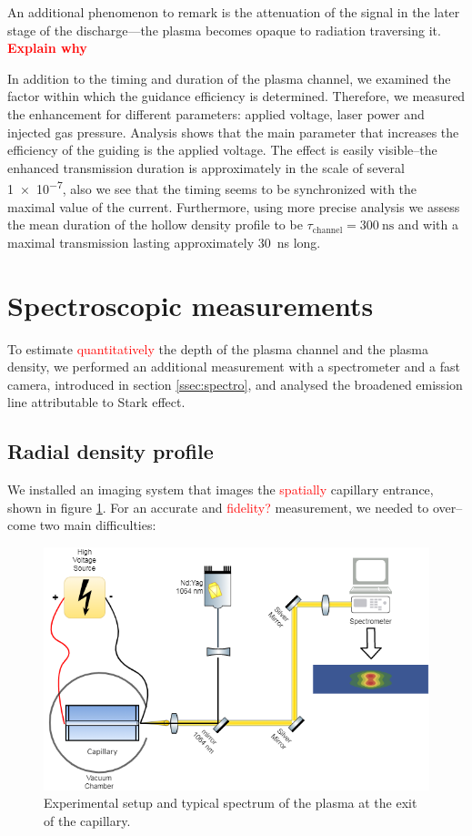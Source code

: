 \documentclass[justified,nofonts,nobib,openany]{tufte-book}
\begin{document}
An additional phenomenon to remark is the attenuation of the signal in the later stage of the discharge---the plasma becomes opaque to radiation traversing it. \textcolor{red}{\textbf{Explain why}}

In addition to the timing and duration of the plasma channel, we examined the factor within which the guidance efficiency is determined. Therefore, we measured the enhancement for different parameters: applied voltage, laser power and injected gas pressure. Analysis shows that the main parameter that increases the efficiency of the guiding is the applied voltage. The effect is easily visible--the enhanced transmission duration is approximately in the scale of several \SI{1e-7}{\sec}, also we see that the timing seems to be synchronized with the maximal value of the current. Furthermore, using more precise analysis we assess the mean duration of the hollow density profile to be $\tau_\text{channel}=\SI{300}{\ns}$ and with a maximal transmission lasting approximately \SI{30}{\ns} long.

\section{Spectroscopic measurements}\label{sec:spectro}
To estimate \textcolor{red}{quantitatively} the depth of the plasma channel and the plasma density, we performed an additional measurement with a spectrometer and a fast camera, introduced in section \ref{ssec:spectro}, and analysed the broadened emission line attributable to Stark effect.

\subsection{Radial density profile}\label{ssec:radial}
We installed an imaging system that images the \textcolor{red}{spatially} capillary entrance, shown in figure \ref{fig:radial_system}. For an accurate and \textcolor{red}{fidelity?} measurement, we needed to over--come two main difficulties:

\begin{figure}
\centering
\includegraphics[width=\textwidth]{./figures/spectro/radial_system.png}
\caption{Experimental setup and typical spectrum of the plasma at the exit of the capillary.}
\label{fig:radial_system}
\end{figure}
\end{document}

